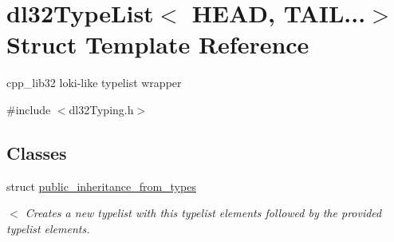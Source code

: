 \hypertarget{structdl32_type_list_3_01_h_e_a_d_00_01_t_a_i_l_8_8_8_4}{\section{dl32\-Type\-List$<$ H\-E\-A\-D, T\-A\-I\-L...$>$ Struct Template Reference}
\label{structdl32_type_list_3_01_h_e_a_d_00_01_t_a_i_l_8_8_8_4}
}


cpp\-\_\-lib32 loki-\/like typelist wrapper  




{\ttfamily \#include $<$dl32\-Typing.\-h$>$}

\subsection*{Classes}
\begin{DoxyCompactItemize}
\item 
struct \hyperlink{structdl32_type_list_3_01_h_e_a_d_00_01_t_a_i_l_8_8_8_4_1_1public__inheritance__from__types}{public\-\_\-inheritance\-\_\-from\-\_\-types}
\begin{DoxyCompactList}\small\item\em $<$ Creates a new typelist with this typelist elements followed by the provided typelist elements. \end{DoxyCompactList}\end{DoxyCompactItemize}
